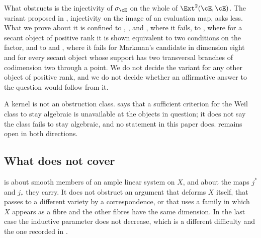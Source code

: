 \begin{remark}\label{rem:weakerscope}
What  obstructs is the injectivity of $\sigma_{\cE}$ on the
whole of $\Ext^{2}(\cE,\cE)$. The variant proposed in
\cite[Question 11.4]{Mar25b}, injectivity on the image of an evaluation map,
asks less. What we prove about it is confined to ,
,  and , where it
fails, to , where for a secant object of positive rank it
is shown equivalent to two conditions on the factor, and to
 and , where it fails
for Markman's candidate in dimension eight and for every secant object whose
support has two transversal branches of codimension two through a point. We
do not decide the variant for any other object of positive rank, and we do
not decide whether an affirmative answer to the question would follow from
it.
\end{remark}

\begin{remark}\label{rem:notnondeform}
A kernel is not an obstruction class.  says that a sufficient
criterion for the Weil class to stay algebraic is unavailable at the objects
in question; it does not say the class fails to stay algebraic, and no
statement in this paper does.  remains open in both
directions.
\end{remark}

\subsection{What \texorpdfstring{}{the hyperplane obstruction} does not cover}

\begin{remark}%
\label{rem:notlinear}
 is about smooth members of an ample linear system on
$X$, and about the maps $j^{*}$ and $j_{*}$ they carry. It does not obstruct
an argument that deforms $X$ itself, that passes to a different variety by a
correspondence, or that uses a family in which $X$ appears as a fibre and the
other fibres have the same dimension. In the last case the inductive parameter
does not decrease, which is a different difficulty and the one recorded in
.
\end{remark}

